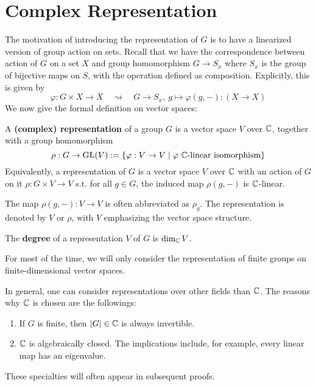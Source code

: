 \documentclass{article}
\begin{document}

\tableofcontents
\newpage

\section{Complex Representation}

\textstart
The motivation of introducing the representation of $G$ is to have a linearized version of group action on sets. Recall that we have the correspondence between action of $G$ on a set $X$ and group homomorphism $G \to S_x$ where $S_x$ is the group of bijective maps on $S$, with the operation defined as composition. Explicitly, this is given by
\[
    \varphi: G \times X \to X \quad \rightsquigarrow \quad G \to S_x,\ g \mapsto \varphi(g, -) : (X \to X) 
\]
We now give the formal definition on vector spaces:

\begin{definition}[Representation]
    A \textbf{(complex) representation} of a group $G$ is a vector space $V$ over $\mathbb{C}$, together with a group homomorphism 
    \[
        \rho: G \to \mathrm{GL}(V) := \{ \varphi: V \to V \mid \varphi \text{ $\mathbb{C}$-linear isomorphism} \}
    \]
    Equivalently, a representation of $G$ is a vector space $V$ over $\mathbb{C}$ with an action of $G$ on it $\rho: G \times V \to V$ s.t. for all $g \in G$, the induced map $\rho(g, -)$ is $\mathbb{C}$-linear.
\end{definition}

\begin{notation}
    The map $\rho(g, -): V \to V$ is often abbreviated as $\rho_g$. The representation is denoted by $V$ or $\rho$, with $V$ emphasizing the vector space structure.
\end{notation}

\begin{definition}
    The \textbf{degree} of a representation $V$ of $G$ is $\dim_{\mathbb{C}}V$. 
\end{definition}

\textstart
For most of the time, we will only consider the representation of finite groups on finite-dimensional vector spaces.

\begin{remark}
    In general, one can consider representations over other fields than $\mathbb{C}$. The reasons why $\mathbb{C}$ is chosen are the followings:
    \begin{enumerate}[label=\arabic*)]
        \item If $G$ is finite, then $\left|G\right| \in \mathbb{C}$ is always invertible.
        \item $\mathbb{C}$ is algebraically closed. The implications include, for example, every linear map has an eigenvalue.
    \end{enumerate}
    These specialties will often appear in subsequent proofs. 
\end{remark}
\end{document}
